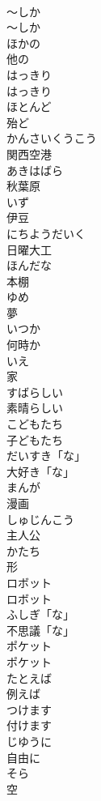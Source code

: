 \documentclass[8pt]{extreport}
\begin{document}
\begin{CJK}{UTF8}{min}
\\	〜しか	
\\	〜しか		
\\	ほかの	
\\	他の	
\\	はっきり	
\\	はっきり	
\\	ほとんど	
\\	殆ど		
\\	かんさいくうこう	
\\	関西空港		
\\	あきはばら	
\\	秋葉原		
\\	いず	
\\	伊豆		
\\	にちようだいく	
\\	日曜大工		
\\	ほんだな	
\\	本棚		
\\	ゆめ	
\\	夢	
\\	いつか	
\\	何時か		
\\	いえ	
\\	家		
\\	すばらしい	
\\	素晴らしい		
\\	こどもたち	
\\	子どもたち		
\\	だいすき「な」	
\\	大好き「な」		
\\	まんが	
\\	漫画		
\\	しゅじんこう	
\\	主人公		
\\	かたち	
\\	形		
\\	ロボット	
\\	ロボット		
\\	ふしぎ「な」	
\\	不思議「な」		
\\	ポケット	
\\	ポケット		
\\	たとえば	
\\	例えば		
\\	つけます	
\\	付けます		
\\	じゆうに	
\\	自由に		
\\	そら	
\\	空		

\end{CJK}
\end{document}
